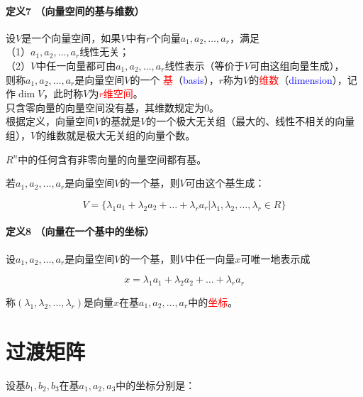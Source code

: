 \documentclass[UTF8]{ctexbook}
\begin{document}
\paragraph{定义7 （向量空间的基与维数）} 设$V$是一个向量空间，如果$V$中有$r$个向量$a_{1},a_{2},\dots,a_{r}$，满足\\（1）$a_ {1},a_{2},\dots,a_{r}$线性无关；\\（2）$V$中任一向量都可由$a_ {1},a_{2},\dots,a_{r}$线性表示（等价于$V$可由这组向量生成），\\则称$a_ {1},a_{2},\dots,a_{r}$是向量空间$V$的一个
\textcolor{red}{基}（\textcolor{blue}{basis}），$r$称为$V$的\textcolor{red}{维数}（\textcolor{blue}{dimension}），记作$\dim V$，此时称$V$为\textcolor{red}{$r$维空间}。\\

只含零向量的向量空间没有基，其维数规定为0。\\

根据定义，向量空间$V$的基就是$V$的一个极大无关组（最大的、线性不相关的向量组），$V$的维数就是极大无关组的向量个数。

$R^{n}$中的任何含有非零向量的向量空间都有基。

若$a_ {1},a_{2},\dots,a_{r}$是向量空间$V$的一个基，则$V$可由这个基生成：

\begin{displaymath}
V=\{ \lambda_{1}a_{1}+\lambda_{2}a_{2}+\dots+\lambda_{r}a_{r} | \lambda_{1},\lambda_{2},\dots,\lambda_{r} \in R \}
\end{displaymath}

\paragraph{定义8 （向量在一个基中的坐标）}设$a_ {1},a_{2},\dots,a_{r}$是向量空间$V$的一个基，则$V$中任一向量$x$可唯一地表示成

\begin{displaymath}
x= \lambda_{1}a_{1}+\lambda_{2}a_{2}+\dots+\lambda_{r}a_{r}
\end{displaymath}

称$(\lambda_{1},\lambda_{2},\dots,\lambda_{r})$是向量$x$在基$a_ {1},a_{2},\dots,a_{r}$中的\textcolor{red}{坐标}。

\section{过渡矩阵}

设基$b_{1},b_{2},b_{3}$在基$a_{1},a_{2},a_{3}$中的坐标分别是：
\end{document}

